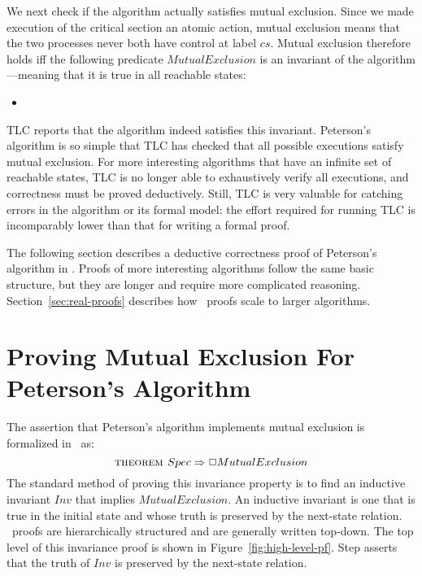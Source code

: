 \documentclass[a4paper,draft]{llncs}
\makeatletter
\renewcommand{\implies}{\Rightarrow}
\renewcommand{\THEOREM}{\textsc{theorem }}
\newcommand{\step}[2]{{\tlatex \@pfstepnum{#1}{#2}}}
\newenvironment{display}{\begin{itemize}\item[]}{\end{itemize}}
\makeatother
\begin{document}
We next check if the algorithm actually satisfies mutual exclusion.
Since we made execution of the critical section an atomic action,
mutual exclusion means that the two processes never both have control
at label $cs$.  Mutual exclusion therefore holds iff the
following predicate $MutualExclusion$ is an invariant of the
algorithm---meaning that it is true in all reachable states:
%
\begin{display}
\begin{tlatex}
\end{tlatex}
\end{display}
%
TLC reports that the algorithm indeed satisfies this invariant. Peterson's
algorithm is so simple that TLC has checked that all possible
executions satisfy mutual exclusion. For more interesting algorithms that have
an infinite set of reachable states, TLC is no longer able to exhaustively
verify all executions, and correctness must be proved deductively. Still, TLC is
very valuable for catching errors in the algorithm or its formal model: the
effort required for running TLC is incomparably lower than that for writing a
formal proof.

The following section describes a deductive correctness proof of Peterson's
algorithm in \tlaplus. Proofs of more interesting algorithms follow the same
basic structure, but they are longer and require more complicated reasoning.
Section~\ref{sec:real-proofs} describes how \tlaplus\ proofs scale to larger
algorithms.


\section{Proving Mutual Exclusion For Peterson's Algorithm}
\label{sec:proving}

The assertion that Peterson's algorithm implements mutual exclusion
is formalized in \tlaplus\ as:
 \[ \THEOREM Spec \implies \Box MutualExclusion
 \]
%
The standard method of proving this invariance property is to find an
inductive invariant $Inv$ that implies $MutualExclusion$.  An
inductive invariant is one that is true in the initial state and whose
truth is preserved by the next-state relation.  \tlaplus\ proofs are
hierarchically structured and are generally written top-down.  The
top level of this invariance proof is shown in
Figure~\ref{fig:high-level-pf}.  Step \step{1}{2} asserts that 
the truth of $Inv$ is preserved by the next-state relation.
\end{document}
